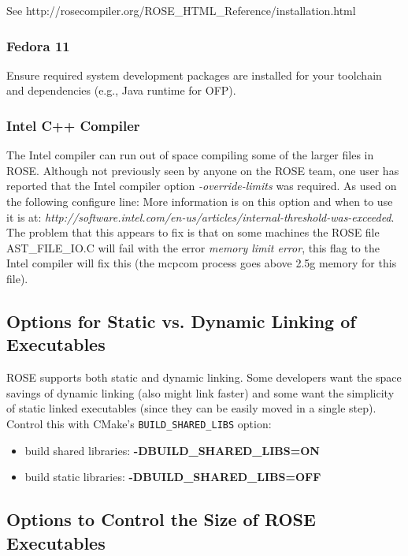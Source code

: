 See http://rosecompiler.org/ROSE\_HTML\_Reference/installation.html

\subsubsection{Fedora 11}
   Ensure required system development packages are installed for your toolchain and
dependencies (e.g., Java runtime for OFP).

\subsubsection{Intel C++ Compiler}
The Intel compiler can run out of space compiling some of the larger files in ROSE.
Although not previously seen by anyone on the ROSE team, one user has reported
that the Intel compiler option {\em -override-limits} was required.  As used on
the following configure line:
More information is on this option and when to use it is at:
{\em http://software.intel.com/en-us/articles/internal-threshold-was-exceeded}.
The problem that this appears to fix is that on some machines the ROSE 
file AST\_FILE\_IO.C will fail with the error {\em memory limit error},
this flag to the Intel compiler will fix this (the mcpcom process goes above 
2.5g memory for this file).


\subsection{Options for Static vs. Dynamic Linking of Executables}
\label{linking_options}

   ROSE supports both static and dynamic linking. Some developers want the
space savings of dynamic linking (also might link faster) and some
want the simplicity of static linked executables (since they can be
easily moved in a single step). Control this with CMake's
{\tt BUILD_SHARED_LIBS} option:
\begin{itemize}
     \item build shared libraries: {\bf -DBUILD\_SHARED\_LIBS=ON}
     \item build static libraries: {\bf -DBUILD\_SHARED\_LIBS=OFF}
\end{itemize}



\subsection{Options to Control the Size of ROSE Executables}

